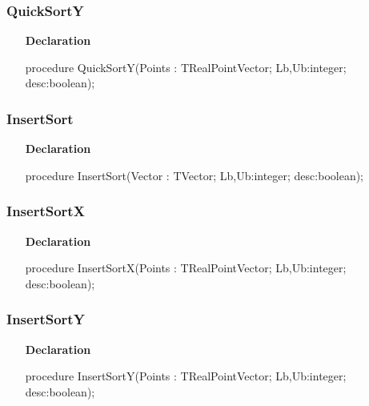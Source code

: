 \documentclass[12pt,a4paper,oneside]{report}
\newcommand{\declarationitem}[1]{\textbf{#1}}
\begin{document}
\subsubsection{QuickSortY}
\label{lmsorting-QuickSortY}
\begin{itemize}\item[\declarationitem{Declaration}\hfill]
	\begin{flushleft}
		\begin{ttfamily}
			procedure QuickSortY(Points : TRealPointVector; Lb,Ub:integer; desc:boolean);\end{ttfamily}
		
	\end{flushleft}
	
\end{itemize}
\subsubsection{InsertSort}
\label{lmsorting-InsertSort}
\begin{itemize}\item[\declarationitem{Declaration}\hfill]
	\begin{flushleft}
		\begin{ttfamily}
			procedure InsertSort(Vector : TVector; Lb,Ub:integer; desc:boolean);\end{ttfamily}
		
	\end{flushleft}
	
\end{itemize}
\subsubsection{InsertSortX}
\label{lmsorting-InsertSortX}
\begin{itemize}\item[\declarationitem{Declaration}\hfill]
	\begin{flushleft}
		\begin{ttfamily}
			procedure InsertSortX(Points : TRealPointVector; Lb,Ub:integer; desc:boolean);\end{ttfamily}
		
	\end{flushleft}
	
\end{itemize}
\subsubsection{InsertSortY}
\label{lmsorting-InsertSortY}
\begin{itemize}\item[\declarationitem{Declaration}\hfill]
	\begin{flushleft}
		\begin{ttfamily}
			procedure InsertSortY(Points : TRealPointVector; Lb,Ub:integer; desc:boolean);\end{ttfamily}
		
	\end{flushleft}
	
\end{itemize}
\end{document}
